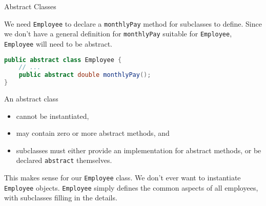 \documentclass{beamer}
\begin{document}
\begin{frame}[fragile]{Abstract Classes}


We need {\tt Employee} to declare a {\tt monthlyPay} method for subclasses to define.  Since we don't have a general definition for {\tt monthlyPay} suitable for {\tt Employee}, {\tt Employee} will need to be abstract.
\begin{lstlisting}[language=Java]
public abstract class Employee {
    // ...
    public abstract double monthlyPay();
}
\end{lstlisting}
An abstract class
\begin{itemize}
\item cannot be instantiated,
\item may contain zero or more abstract methods, and
\item subclasses must either provide an implementation for abstract methods, or be declared {\tt abstract} themselves.
\end{itemize}

This makes sense for our {\tt Employee} class.  We don't ever want to instantiate {\tt Employee} objects.  {\tt Employee} simply defines the common aspects of all employees, with subclasses filling in the details.

\end{frame}








\end{document}
